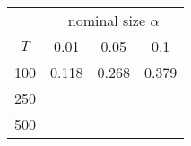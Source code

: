 % 
\begin{tabular}{cccc}
  \hline
  & \multicolumn{3}{c}{nominal size $\alpha$} \\
 $T$ & 0.01 & 0.05 & 0.1 \\
 \hline
100 & 0.118 & 0.268 & 0.379 \\ 
  250 &  &  &  \\ 
  500 &  &  &  \\ 
   \hline
\end{tabular}
